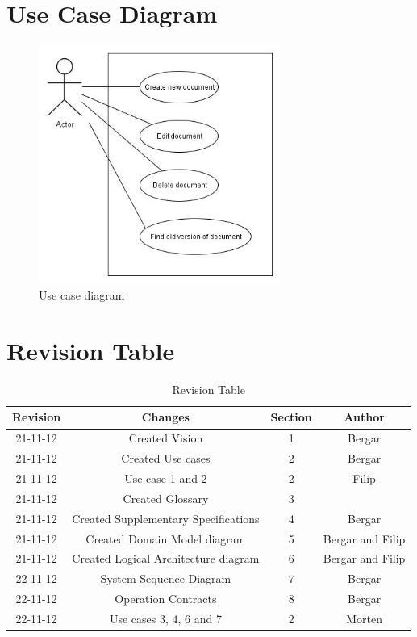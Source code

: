 \documentclass[11pt,a4paper]{article}
\begin{document}
\section{Use Case Diagram}
	\begin{figure}[H]
  		\centering
    	\includegraphics[width=300px]{images/UseCaseDiagram.jpg}
    	\caption{Use case diagram}
	\end{figure}



\section{Revision Table}
\begin{table}[h]
\caption{Revision Table}
\begin{center}
\begin{tabular}{c|c|c|c}
\hline 
Revision & Changes & Section & Author \\ \hline 
21-11-12 & Created Vision & 1 & Bergar \\ 
21-11-12 & Created Use cases & 2 & Bergar \\
21-11-12 & Use case 1 and 2 & 2 & Filip \\
21-11-12 & Created Glossary & 3 & \\
21-11-12 & Created Supplementary Specifications & 4 & Bergar \\ 
21-11-12 & Created Domain Model diagram & 5 & Bergar and Filip \\
21-11-12 & Created Logical Architecture diagram & 6 & Bergar and Filip \\
\hline 
22-11-12 & System Sequence Diagram & 7 & Bergar \\
22-11-12 & Operation Contracts & 8 & Bergar \\
22-11-12 & Use cases 3, 4, 6 and 7 & 2 & Morten \\
\hline
\end{tabular} 
\end{center}
\end{table}
	
\end{document}
